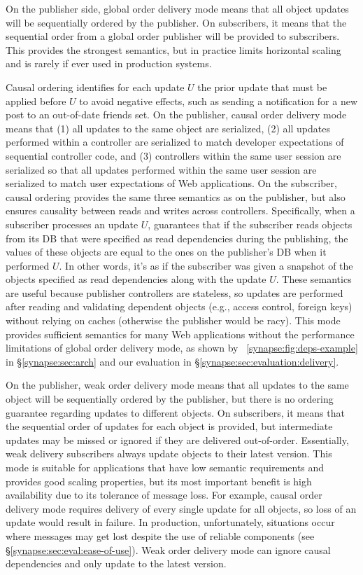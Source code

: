 On the publisher side, global order delivery mode means that all object
updates will be sequentially ordered by the publisher.  On
subscribers, it means that the sequential order from a global order
publisher will be provided to subscribers.  This provides the
strongest semantics, but in practice limits horizontal scaling and is
rarely if ever used in production systems.  

Causal ordering identifies for each update $U$ the prior update that
must be applied before $U$ to avoid negative effects, such as sending a
notification for a new post to an out-of-date friends set.
On the publisher, causal order delivery mode means that (1) all 
updates to the same object are serialized, (2) all updates performed
within a controller are serialized to match developer expectations of
sequential controller code, and (3) controllers within the same
user session are serialized so that all updates performed within the
same user session are serialized to match user expectations of Web
applications.
On the subscriber, causal ordering provides the same three semantics as on the
publisher, but also ensures causality between
reads and writes across controllers. 
Specifically, when a subscriber processes an update $U$, \synapse guarantees
that if the subscriber reads objects from its DB that were specified as read dependencies
during the publishing, the values of these objects are equal
to the ones on the publisher's DB when it performed $U$.
In other words, it's as if the subscriber was given a snapshot of the objects
specified as read dependencies along with the update $U$.
These semantics are useful because publisher controllers are stateless, so
updates are performed after reading and validating dependent objects (e.g.,
access control, foreign keys) without relying on caches (otherwise the publisher
would be racy).
This mode provides sufficient semantics for many Web applications
without the performance limitations of global order delivery mode, as shown by 
\F~\ref{synapse:fig:deps-example} in \S\ref{synapse:sec:arch} and our evaluation
in \S\ref{synapse:sec:evaluation:delivery}. 


On the publisher, weak order delivery mode means that all updates to the
same object will be sequentially ordered by the publisher, but there
is no ordering guarantee regarding updates to different objects.  On
subscribers, it means that the sequential order of updates for each 
object is provided, but intermediate updates may be
missed or ignored if they are delivered out-of-order.  Essentially,
weak delivery subscribers always update objects to their
latest version.  
This mode is suitable for applications that have low semantic
requirements and provides good scaling properties, but its
most important benefit is high availability due to its tolerance of
message loss.  For example, causal order delivery mode 
requires delivery of every single update for all objects, so loss
of an update would result in failure.  In production, unfortunately,
situations occur where messages may get lost despite the use of
reliable components (see \S\ref{synapse:sec:eval:ease-of-use}).  Weak
order delivery mode can ignore causal dependencies and only update
to the latest version.

